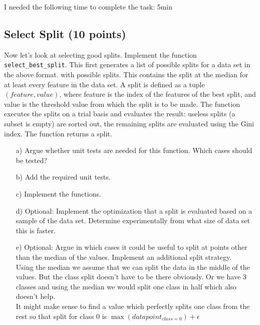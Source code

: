 I needed the following time to complete the task: 5min

\subsection{Select Split (10 points)}

Now let's look at selecting good splits. Implement the function \texttt{select\_best\_split}. This first generates a list of possible splits for a data set in the above format.
with possible splits. This contains the split at the median for at least every feature in the data set. A split is defined as a tuple $( feature, value )$, where feature is the index of the
features of the best split, and value is the threshold value from which the split is to be made. The function executes the splits on a trial basis and evaluates the result: useless splits
(a subset is empty) are sorted out, the remaining splits are evaluated using the Gini index. The function returns a split. 

\begin{enumerate}

\item[a)] Argue whether unit tests are needed for this function. Which cases should be tested?

\item[b)] Add the required unit tests.

\item[c)] Implement the functions.

\item[d)] Optional: Implement the optimization that a split is evaluated based on a sample of the data set. Determine experimentally from what size of data set this is faster.

\item[e)] Optional: Argue in which cases it could be useful to split at points other than the median of the values. Implement an additional split strategy.
\\
Using the median we assume that we can split the data in the middle of the values. But the class split doesn't have to be there obviously. Or we have 3 classes and using the median we would split one class in half which also doesn't help.\\
It might make sense to find a value which perfectly splits one class from the rest so that split for class 0 is $\max(datapoint_{class = 0}) + \epsilon$


\end{enumerate}

